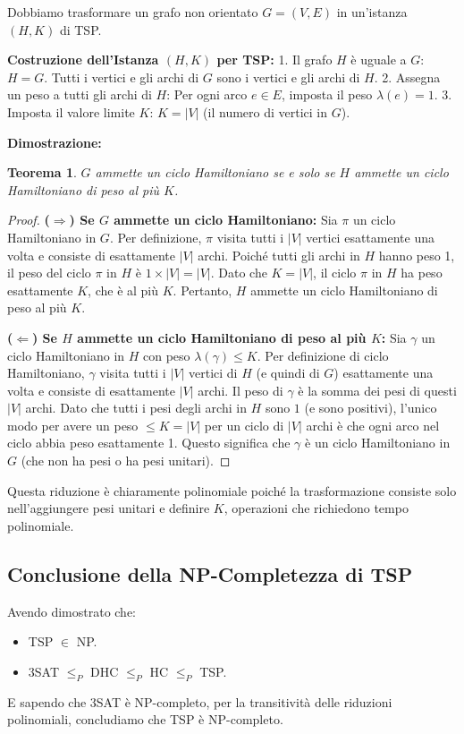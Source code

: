 \documentclass[a4paper, 11pt]{book} %
\newtheorem{theorem}{Teorema}[section]
\theoremstyle{definition}
\begin{document}
Dobbiamo trasformare un grafo non orientato $G=(V, E)$ in un'istanza $(H, K)$ di TSP.

\textbf{Costruzione dell'Istanza $(H, K)$ per TSP:}
1.  Il grafo $H$ è uguale a $G$: $H=G$. Tutti i vertici e gli archi di $G$ sono i vertici e gli archi di $H$.
2.  Assegna un peso a tutti gli archi di $H$: Per ogni arco $e \in E$, imposta il peso $\lambda(e)=1$.
3.  Imposta il valore limite $K$: $K=|V|$ (il numero di vertici in $G$).

\textbf{Dimostrazione:}
\begin{theorem}
$G$ ammette un ciclo Hamiltoniano se e solo se $H$ ammette un ciclo Hamiltoniano di peso al più $K$.
\end{theorem}
\begin{proof}
\textbf{($\Rightarrow$) Se $G$ ammette un ciclo Hamiltoniano:}
Sia $\pi$ un ciclo Hamiltoniano in $G$. Per definizione, $\pi$ visita tutti i $|V|$ vertici esattamente una volta e consiste di esattamente $|V|$ archi.
Poiché tutti gli archi in $H$ hanno peso 1, il peso del ciclo $\pi$ in $H$ è $1 \times |V| = |V|$.
Dato che $K=|V|$, il ciclo $\pi$ in $H$ ha peso esattamente $K$, che è al più $K$.
Pertanto, $H$ ammette un ciclo Hamiltoniano di peso al più $K$.

\textbf{($\Leftarrow$) Se $H$ ammette un ciclo Hamiltoniano di peso al più $K$:}
Sia $\gamma$ un ciclo Hamiltoniano in $H$ con peso $\lambda(\gamma) \le K$.
Per definizione di ciclo Hamiltoniano, $\gamma$ visita tutti i $|V|$ vertici di $H$ (e quindi di $G$) esattamente una volta e consiste di esattamente $|V|$ archi.
Il peso di $\gamma$ è la somma dei pesi di questi $|V|$ archi. Dato che tutti i pesi degli archi in $H$ sono $1$ (e sono positivi), l'unico modo per avere un peso $\le K=|V|$ per un ciclo di $|V|$ archi è che ogni arco nel ciclo abbia peso esattamente 1.
Questo significa che $\gamma$ è un ciclo Hamiltoniano in $G$ (che non ha pesi o ha pesi unitari).
\end{proof}

Questa riduzione è chiaramente polinomiale poiché la trasformazione consiste solo nell'aggiungere pesi unitari e definire $K$, operazioni che richiedono tempo polinomiale.

\subsection{Conclusione della NP-Completezza di TSP}

Avendo dimostrato che:
\begin{itemize}
    \item TSP $\in$ NP.
    \item 3SAT $\le_P$ DHC $\le_P$ HC $\le_P$ TSP.
\end{itemize}
E sapendo che 3SAT è NP-completo, per la transitività delle riduzioni polinomiali, concludiamo che TSP è NP-completo.
\end{document}
